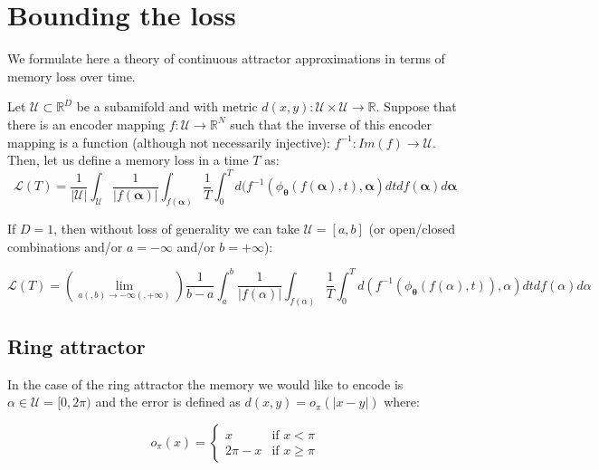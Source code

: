 \documentclass{article} %
\newcounter{ct}
\theoremstyle{definition}
\theoremstyle{remark}
\begin{document}
\newpage

\section{Bounding the loss}\label{sec:app:bouding}
We formulate here a theory of continuous attractor approximations in terms of memory loss over time.

Let $\mathcal{U}\subset \mathbb{R}^D$ be a subamifold and  with metric $d(x,y): \mathcal{U} \times \mathcal{U} \rightarrow \mathbb{R}$.
Suppose that there is an encoder mapping $f: \mathcal{U} \rightarrow \mathbb{R}^N$ such that the inverse of this encoder mapping is a function (although not necessarily injective): $f^{-1}: Im(f) \rightarrow \mathcal{U}$. 
Then, let us define a memory loss in a time $T$ as:
\begin{equation}
    \mathcal{L}(T) = \frac{1}{|\mathcal{U}|} \int_\mathcal{U}  \frac{1}{|f(\bm{\alpha})|} \int_{f(\bm{\alpha})} \frac{1}{T} \int_0^T d(f^{-1}(\phi_{\bm{\theta}}(f(\bm{\alpha}),t),\bm{\alpha}) dt df(\bm{\alpha}) d\bm{\alpha}
\end{equation}

If $D = 1$, then without loss of generality we can take $\mathcal{U} = [a,b]$ (or open/closed combinations and/or $a = -\infty$ and/or $b = +\infty$):

\begin{equation}
    \mathcal{L}(T) = \left(\lim_{a(,b) \rightarrow -\infty(,+\infty)}\right) \frac{1}{b - a} \int_a^b  \frac{1}{|f(\alpha)|} \int_{f(\alpha)} \frac{1}{T} \int_0^T d(f^{-1}(\phi_{\bm{\theta}}(f(\alpha),t)),\alpha) dt df(\alpha) d\alpha
\end{equation}

\subsection{Ring attractor}

In the case of the ring attractor the memory we would like to encode is $\alpha \in \mathcal{U} = [0,2 \pi)$ and the error is defined as $d(x,y) = o_\pi(|x-y|)$ where:

\begin{equation}
    o_\pi(x) = \begin{cases}
    x & \text{if } x < \pi \\
    2 \pi - x & \text{if } x \geq \pi
    \end{cases}
\end{equation}
\end{document}
